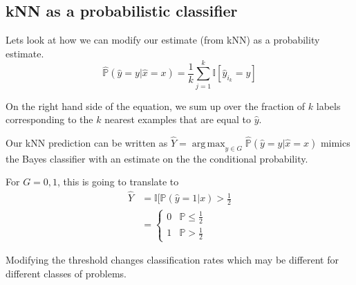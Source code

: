 \documentclass[a4paper]{article}
\DeclareMathOperator*{\argmax}{arg\,max}
\begin{document}
\subsection{kNN as a probabilistic classifier}

Lets look at how we can modify our estimate (from kNN) as a probability estimate.
\[\hat{\mathbb{P}}(\hat{y}=y \vert \hat{x} = x) = \frac{1}{k}\sum_{j=1}^{k} \mathbb{I}[\hat{y}_{i_{k}} = y]\]

On the right hand side of the equation, we sum up over the fraction of $k$ labels corresponding to the $k$ nearest examples that are equal to $\hat{y}$.

Our kNN prediction can be written as $\hat{Y} = \argmax_{y \in G} \mathbb{\hat{P}}(\hat{y} = y \vert \hat{x} = x)$ mimics the Bayes classifier with an estimate on the the conditional probability.

For $G = {0, 1}$, this is going to translate to
\begin{align*}
\hat{Y} &= \mathbb{I}[\mathbb{P}(\hat{y} = 1 \vert x) > \frac{1}{2} \\
&= \begin{cases}0 &  \mathbb{P} \leq \frac{1}{2} \\ 1 &  \mathbb{P} > \frac{1}{2} \end{cases}
\end{align*}

Modifying the threshold changes classification rates which may be different for different classes of problems.
\end{document}
